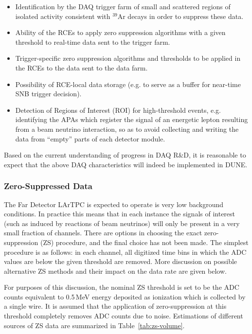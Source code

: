 \begin{itemize}

\item Identification by the DAQ trigger farm of small and scattered regions of isolated activity
  consistent with $^{39}$Ar decays in order to suppress these data.

\item Ability of the RCEs to apply zero suppression algorithms
with a given threshold to real-time data sent to the trigger farm.

\item Trigger-specific zero suppression algorithms and thresholds to be applied
in the RCEs to the data sent to the data farm.

\item Possibility of RCE-local data storage (e.g. to serve as a buffer for near-time SNB trigger decision).

\item Detection of Regions of Interest (ROI) for high-threshold events, e.g. identifying the APAs
which register the signal of an energetic lepton resulting from a beam neutrino interaction, so as
to avoid collecting and writing the data from ``empty'' parts of each detector module.

\end{itemize}

\noindent
Based on the current understanding of progress in DAQ R\&D, it is reasonable to expect 
that the above DAQ characteristics will indeed be implemented in DUNE.




\subsubsection{Zero-Suppressed Data}
\label{sec:zs-data}
The Far Detector LArTPC is expected to operate is very low background conditions. In practice
this means that in each instance the signals of interest (such as induced by reactions of beam neutrinos)
will only be present in a very small fraction of channels. There are options in choosing the exact zero-suppression (ZS)
procedure, and the final choice has not been made. The simplest procedure is
as follows: in each channel, all digitized time bins in which the ADC values are below the given threshold
are removed. More discussion on possible alternative ZS methods and their impact on the data rate are given below.

For purposes of this discussion, the nominal ZS threshold is set to be the ADC counts equivalent to 0.5\,MeV energy deposited
as ionization which is collected by a single wire. It is assumed that the application of zero-suppression at this
threshold completely removes ADC counts due to noise. %
Estimations of different sources of ZS data are summarized in Table~\ref{tab:zs-volume}.


